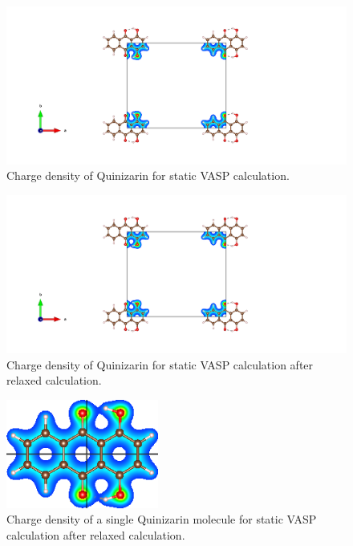 \documentclass{article}
\begin{document}
      \begin{figure}[H]
        \centering
        \includegraphics[width = \textwidth]{../fig/basic_staticbefore_CHGCAR.png}
        \caption{Charge density of Quinizarin for static VASP calculation. }
        \label{fig:basic_staticbefore_CHGCAR}
      \end{figure}

      \begin{figure}[H]
        \centering
        \includegraphics[width = \textwidth]{../fig/basic_staticafter_CHGCAR.png}
        \caption{Charge density of Quinizarin for static VASP calculation after relaxed calculation. }
        \label{fig:basic_staticafter_CHGCAR}
      \end{figure}

      \begin{figure}[H]
        \centering
        \includegraphics[width = 5cm]{../fig/basic_staticafter_CHGDENSITY.png}
        \caption{Charge density of a single Quinizarin molecule for static VASP calculation after relaxed calculation. }
        \label{fig:basic_staticafter_CHGDENSITY}
      \end{figure}
\end{document}

